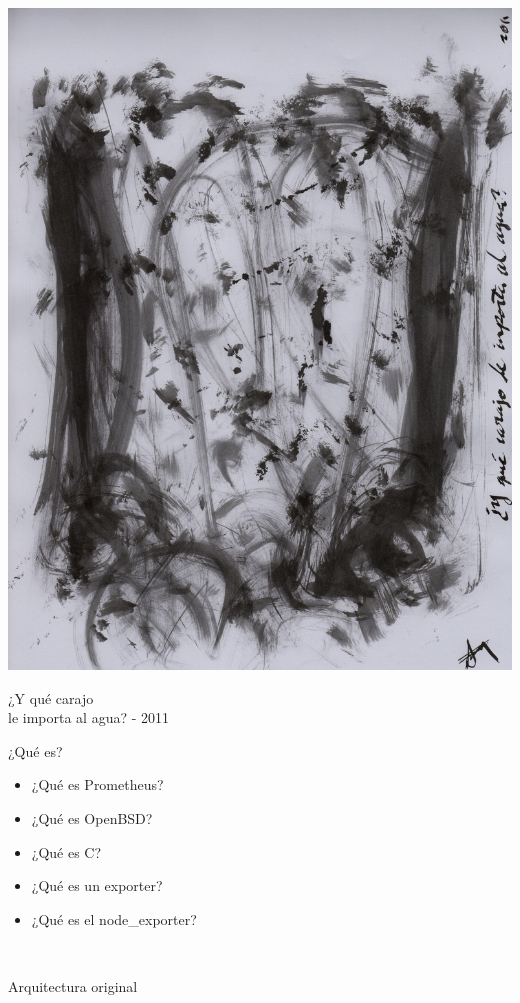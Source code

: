 \documentclass[11pt,spanish]{article}
\newcommand{\fr}[1]{%
	\begin{flushright}
		#1
	\end{flushright}
}
\newcommand{\rowsp}[1][1em]{\vspace{#1}}
\newcommand{\hone}[1]{{\rowsp[0.3em]\noindent\Large #1 \rowsp[0.3em]}}
\newcommand{\displaypage}[1]{%
\
\vspace{\stretch{1}}
\begin{center}
\hone{#1}
\end{center}
\vspace{\stretch{1}}
}
\newcommand{\myitm}[1]{\begin{itemize}#1\end{itemize}}
\begin{document}
\begin{Row}
\begin{Cell}{1}
\ \\ %
\includegraphics[width=\textwidth]{img/carajo}
\fr{ {\tiny ¿Y qué carajo\\
le importa al agua? - 2011} }
\end{Cell}

\end{Row}


\newpage %
\hone{¿Qué es?}

\myitm{
	\item ¿Qué es Prometheus?
	\item ¿Qué es OpenBSD?
	\item ¿Qué es C?
	\item ¿Qué es un exporter?
	\item ¿Qué es el node\_exporter?
}

\newpage %
\displaypage{Arquitectura original}
\end{document}
